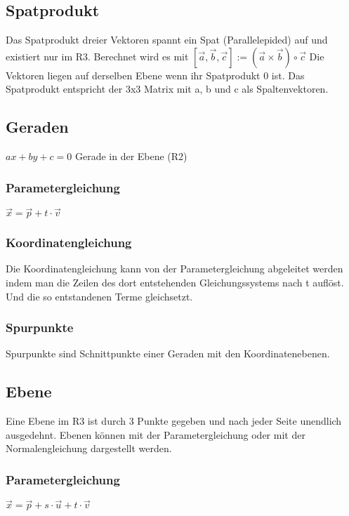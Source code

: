 \documentclass[11pt,a4paper,onecolumn]{article}
\begin{document}
\begin{flushleft}
\subsection{Spatprodukt}
Das Spatprodukt dreier Vektoren spannt ein Spat (Parallelepided) auf und existiert nur im R3. Berechnet wird es mit \linebreak
$[\vec{a},\vec{b},\vec{c}] := (\vec{a}\times\vec{b})\circ \vec{c}$ \linebreak
Die Vektoren liegen auf derselben Ebene wenn ihr Spatprodukt 0 ist.\linebreak
Das Spatprodukt entspricht der 3x3 Matrix mit a, b und c als Spaltenvektoren.

\subsection{Geraden}
$ax + by + c = 0 $ Gerade in der Ebene (R2)

\subsubsection{Parametergleichung}
$\vec{x} = \vec{p} + t \cdot \vec{v}$

\subsubsection{Koordinatengleichung}
Die Koordinatengleichung kann von der Parametergleichung abgeleitet werden indem man die Zeilen des dort entstehenden Gleichungssystems nach t auflöst. Und die so entstandenen Terme gleichsetzt.



\subsubsection{Spurpunkte}
Spurpunkte sind Schnittpunkte einer Geraden mit den Koordinatenebenen.

\subsection{Ebene}
Eine Ebene im R3 ist durch 3 Punkte gegeben und nach jeder Seite unendlich ausgedehnt. Ebenen können mit der Parametergleichung oder mit der Normalengleichung dargestellt werden.

\subsubsection{Parametergleichung}
$ \vec{x} = \vec{p} + s \cdot \vec{u} + t \cdot \vec{v}$

\end{flushleft}
\end{document}
